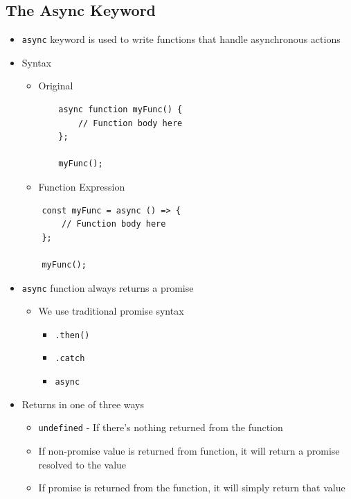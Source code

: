 \documentclass[12pt]{article}
\begin{document}
\subsection{The Async Keyword}
\begin{itemize}
    \item \texttt{async} keyword is used to write functions that handle asynchronous actions
    \item Syntax
    \begin{itemize}
        \item Original

    \begin{lstlisting}
    async function myFunc() {
        // Function body here
    };

    myFunc();
    \end{lstlisting}

        \item Function Expression
    \end{itemize}

    \begin{lstlisting}
    const myFunc = async () => {
        // Function body here
    };

    myFunc();
    \end{lstlisting}

    \item \texttt{async} function always returns a promise
    \begin{itemize}
        \item We use traditional promise syntax
        \begin{itemize}
            \item \texttt{.then()}
            \item \texttt{.catch}
            \item \texttt{async}
        \end{itemize}
    \end{itemize}

    \item Returns in one of three ways
    \begin{itemize}
        \item \texttt{undefined} - If there’s nothing returned from the function
        \item If non-promise value is returned from function, it will return a promise resolved to the value
        \item If promise is returned from the function, it will simply return that value
    \end{itemize}
\end{itemize}
\end{document}
